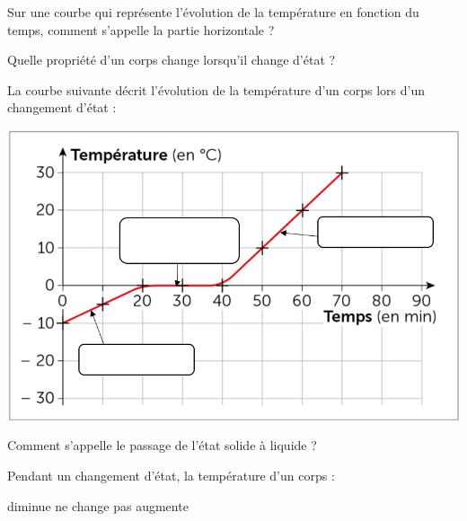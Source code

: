 
	\begin{questions}
		
	
		\question[2] Sur une courbe qui représente l'évolution de la température en fonction du temps, comment s'appelle la partie horizontale ?
		
		\fillwithdottedlines{1.5cm}  
		
	
		
		\question[2] Quelle propriété d'un corps change lorsqu'il change d'état ?
		
		\fillwithdottedlines{1.5cm}  
		
		\question[6] La courbe suivante décrit l'évolution de la température d'un corps lors d'un changement d'état :
		
		\begin{center}
			\includegraphics[scale=0.65]{courbe}
		\end{center}
	
	
	
		\question[2] Comment s'appelle le passage de l'état solide à liquide ?
		\fillwithdottedlines{1.5cm}
		
		\question[2] Pendant un changement d'état, la température d'un corps :
		\begin{checkboxes}
			\choice diminue
			\correctchoice ne change pas
			\choice augmente
		\end{checkboxes}
	

\end{questions}
